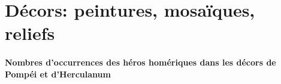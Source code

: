 \documentclass[14pt]{these}
\begin{document}
\null\vfill
\tableofcontents*
\vfill

\part{Décors: peintures, mosaïques, reliefs}
\newcommand{\decor}[2][]{
  {
    \setkeys{bdd}{#1}
    \centering
    \texttt{[image: \#2]}

    \vfill
    \ifx\BDDhouse\empty\else\BDDhouse\\\fi
    \BDDname\\
    \textbf{Sujet:} \BDDsubject\\
    \textbf{Type:} \BDDtype\\ 
    \textbf{Datation:} \BDDdate\\ 
    \textbf{Pièce, paroi:} \BDDroom, \BDDwall\\
    \textbf{Artiste:} \BDDartist\\ 
    \textbf{Localisation actuelle:} \BDDlocation\\
    \textbf{Crédits photographiques:} \BDDcredits

    \vspace{2\onelineskip}
  }
  \clearpage
}


\subsection*{Nombres d'occurrences des héros homériques dans les décors de Pompéi
et d'Herculanum}
\end{document}
